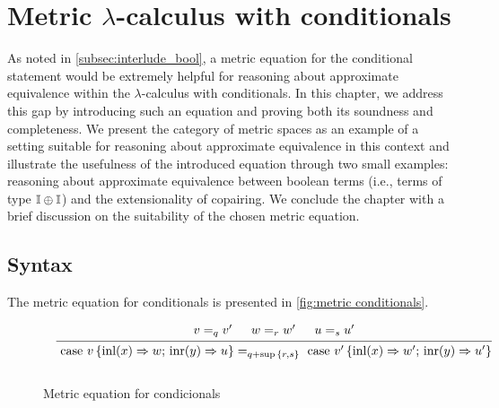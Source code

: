 \chapter{Metric $\lambda$-calculus with conditionals} \label{ch:conditionals}

As noted in \autoref{subsec:interlude_bool}, a metric equation for the conditional statement would be extremely helpful for reasoning about approximate equivalence within the $\lambda$-calculus with conditionals. In this chapter, we address this gap by introducing such an equation and proving both its soundness and completeness. We present the category of metric spaces as an example of a setting suitable for reasoning about approximate equivalence in this context and illustrate the usefulness of the introduced equation through two small examples: reasoning about approximate equivalence between boolean terms (i.e., terms of type $\mathbb{I} \oplus \mathbb{I}$) and the extensionality of copairing. We conclude the chapter with a brief discussion on the suitability of the chosen metric equation.






\section{Syntax}

The metric equation for conditionals is presented in \autoref{fig:metric conditionals}. 

\begin{figure}[H]
  \begin{equation*}
  \begin{aligned}
  &
  &
  \begin{prooftree}
      \hypo{ v =_{q} v' }
      \hypo{w=_{r} w'}
      \hypo{u=_{s}u'}
      \infer3[]{\text{ case } v \,   \{\text{inl} (x) \Rightarrow w ; \, \text{inr} (y) \Rightarrow u\} =_{q+\sup{\{ r, s \}}} \text{ case } v' \,  \{\text{inl} (x) \Rightarrow w' ; \,\text{inr} (y) \Rightarrow u'\} }
  \end{prooftree}
  \\[10pt]
  \end{aligned}
  \end{equation*}
  \caption{Metric equation for condicionals}
  \label{fig:metric conditionals}
\end{figure}


